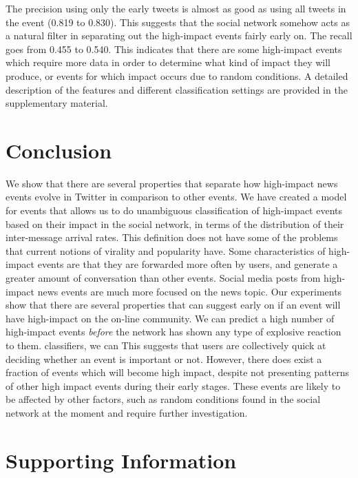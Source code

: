 \documentclass[10pt,letterpaper]{article}
\newcommand{\inblue}[1]{{\color{MyBlue}\sf\textbf{\textsc{#1}}}}
\newcommand{\supplementary}[0]{\inblue{[Supplementary Material]}}
\begin{document}
The precision using only the early tweets is almost as good as using
all tweets in the event (0.819 to 0.830). This suggests that the
social network somehow acts as a natural filter in separating out the
high-impact events fairly early on.  The recall goes from 0.455 to
0.540. This indicates that there are some high-impact events which
require more data in order to determine what kind of impact they will
produce, or events for which impact occurs due to random conditions. A
detailed description of the features and different classification
settings are provided in the supplementary material.%




\section*{Conclusion}

We show that there are several properties that separate how
high-impact news events evolve in Twitter in comparison to other
events. We have created a model for events that allows us to do
unambiguous classification of high-impact events based on their impact
in the social network, in terms of the distribution of their
inter-message arrival rates. This definition does not have some of the
problems that current notions of virality and popularity have. Some
characteristics of high-impact events are that they are forwarded more
often by users, and generate a greater amount of conversation than
other events.  Social media posts from high-impact news events are
much more focused on the news topic. Our experiments show that there
are several properties that can suggest early on if an event will have
high-impact on the on-line community.  We can predict a high number of
high-impact events {\em before} the network has shown any type of
explosive reaction to them. %
classifiers, we can
This suggests that users are collectively quick at deciding whether an
event is important or not.  However, there does exist a fraction of
events which will become high impact, despite not presenting
patterns of other high impact events during their early stages.  These
events are likely to be affected by other factors, such as random
conditions found in the social network at the moment and require
further investigation.

\section*{Supporting Information}
\end{document}
